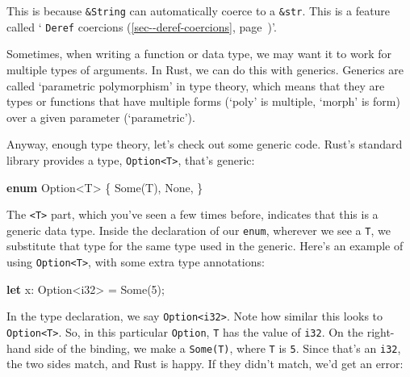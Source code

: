 \documentclass[a4paper,]{book}
\renewcommand*{\hyperref}[2][\ar]{%
  \def\ar{#2}%
  #2 (\autoref{#1}, page~\pageref{#1})}
\newenvironment{Shaded}{\begin{snugshade}}{\end{snugshade}}
\newcommand{\KeywordTok}[1]{\textcolor[rgb]{0.13,0.29,0.53}{\textbf{{#1}}}}
\newcommand{\DataTypeTok}[1]{\textcolor[rgb]{0.13,0.29,0.53}{{#1}}}
\newcommand{\DecValTok}[1]{\textcolor[rgb]{0.00,0.00,0.81}{{#1}}}
\newcommand{\ConstantTok}[1]{\textcolor[rgb]{0.00,0.00,0.00}{{#1}}}
\newcommand{\NormalTok}[1]{{#1}}
\begin{document}
This is because \texttt{\&String} can automatically coerce to a
\texttt{\&str}. This is a feature called
`\hyperref[sec--deref-coercions]{\texttt{Deref} coercions}'.


Sometimes, when writing a function or data type, we may want it to work
for multiple types of arguments. In Rust, we can do this with generics.
Generics are called `parametric polymorphism' in type theory, which
means that they are types or functions that have multiple forms (`poly'
is multiple, `morph' is form) over a given parameter (`parametric').

Anyway, enough type theory, let's check out some generic code. Rust's
standard library provides a type,
\texttt{Option\textless{}T\textgreater{}}, that's generic:

\begin{Shaded}
\begin{Highlighting}[]
\KeywordTok{enum} \DataTypeTok{Option}\NormalTok{<T> \{}
    \ConstantTok{Some}\NormalTok{(T),}
    \ConstantTok{None}\NormalTok{,}
\NormalTok{\}}
\end{Highlighting}
\end{Shaded}

The \texttt{\textless{}T\textgreater{}} part, which you've seen a few
times before, indicates that this is a generic data type. Inside the
declaration of our \texttt{enum}, wherever we see a \texttt{T}, we
substitute that type for the same type used in the generic. Here's an
example of using \texttt{Option\textless{}T\textgreater{}}, with some
extra type annotations:

\begin{Shaded}
\begin{Highlighting}[]
\KeywordTok{let} \NormalTok{x: }\DataTypeTok{Option}\NormalTok{<}\DataTypeTok{i32}\NormalTok{> = }\ConstantTok{Some}\NormalTok{(}\DecValTok{5}\NormalTok{);}
\end{Highlighting}
\end{Shaded}

In the type declaration, we say
\texttt{Option\textless{}i32\textgreater{}}. Note how similar this looks
to \texttt{Option\textless{}T\textgreater{}}. So, in this particular
\texttt{Option}, \texttt{T} has the value of \texttt{i32}. On the
right-hand side of the binding, we make a \texttt{Some(T)}, where
\texttt{T} is \texttt{5}. Since that's an \texttt{i32}, the two sides
match, and Rust is happy. If they didn't match, we'd get an error:
\end{document}

